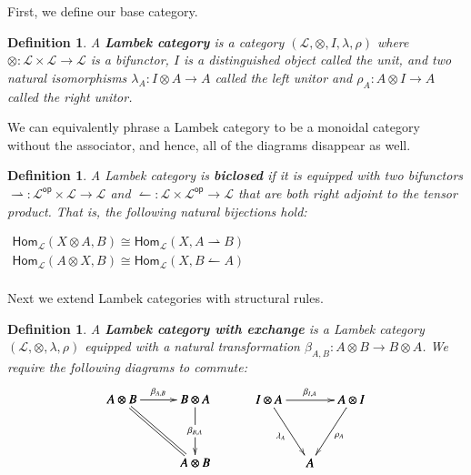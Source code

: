 \documentclass{article}
\newtheorem{definition}[theorem]{Definition}
\let\mto\to
\let\to\relax
\newcommand{\to}{\rightarrow}
\newcommand{\rto}{\leftharpoonup}
\newcommand{\lto}{\rightharpoonup}
\newcommand{\cat}[1]{\mathcal{#1}}
\newcommand{\catop}[1]{\cat{#1}^{\mathsf{op}}}
\newcommand{\Hom}[3]{\mathsf{Hom}_{\cat{#1}}(#2,#3)}
\begin{document}
First, we define our base category.
\begin{definition}
  \label{def:Lambek-category}
  A \textbf{Lambek category} is a category $(\cat{L}, \otimes, I,
  \lambda, \rho)$ where $\otimes : \cat{L} \times \cat{L} \mto
  \cat{L}$ is a bifunctor, $I$ is a distinguished object called the
  unit, and two natural isomorphisms $\lambda_A : I \otimes A \mto A$
  called the left unitor and $\rho_A : A \otimes I \mto A$ called the
  right unitor.
\end{definition}
We can equivalently phrase a Lambek category to be a monoidal category
without the associator, and hence, all of the diagrams disappear as
well.
\begin{definition}
  \label{def:biclosed}
  A Lambek category is \textbf{biclosed} if it is equipped with two
  bifunctors $\lto : \catop{L} \times \cat{L} \mto \cat{L}$ and $\rto
  : \cat{L} \times \catop{L} \mto \cat{L}$ that are both right adjoint
  to the tensor product.  That is, the following natural bijections
  hold:
  \begin{center}
    \begin{math}
      \begin{array}{lll}
        \Hom{L}{X \otimes A}{B} \cong \Hom{L}{X}{A \lto B}\\
        \Hom{L}{A \otimes X}{B} \cong \Hom{L}{X}{B \rto A}\\
      \end{array}
    \end{math}
  \end{center}
\end{definition}
Next we extend Lambek categories with structural rules.
\begin{definition}
  \label{def:exchange}
  A \textbf{Lambek category with exchange} is a Lambek category
  $(\cat{L}, \otimes, \lambda, \rho)$ equipped with a natural
  transformation $\beta_{A,B}:A \otimes B \mto B \otimes A$.  We
  require the following diagrams to commute:
  \[
  \begin{array}{cccccccc}    
    \bfig
    \qtriangle|amm|/->`=`->/<580,500>[
      A \otimes B`
      B \otimes A`
      A \otimes B;
      \beta_{A,B}``
      \beta_{B,A}]
    \efig
    &
    \quad
    &
    \bfig    
    \Vtriangle/->`->`->/<325,500>[
      I \otimes A`
      A \otimes I`
      A;
      \beta_{I,A}`
      \lambda_{A}`
      \rho_{A}]
    \efig
  \end{array}
  \]    
\end{definition}
\end{document}
